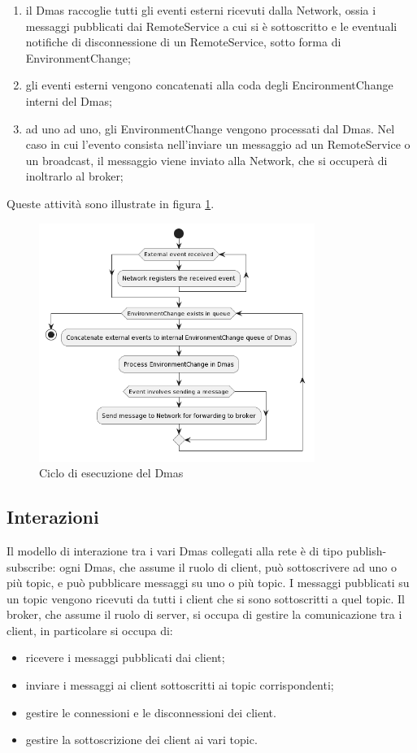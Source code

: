 \begin{enumerate}
    \item il Dmas raccoglie tutti gli eventi esterni ricevuti dalla Network, ossia i messaggi pubblicati dai RemoteService a cui si è sottoscritto e le eventuali notifiche di disconnessione di un RemoteService, sotto forma di EnvironmentChange;
    \item gli eventi esterni vengono concatenati alla coda degli EncironmentChange interni del Dmas;
    \item ad uno ad uno, gli EnvironmentChange vengono processati dal Dmas. Nel caso in cui l'evento consista nell'inviare un messaggio ad un RemoteService o un broadcast, il messaggio viene inviato alla Network, che si occuperà di inoltrarlo al broker;
\end{enumerate}

Queste attività sono illustrate in figura \ref{fig:execution}.

\begin{figure}
    \centering
    \includegraphics[width=0.8\textwidth]{figures/activity-applychanges.png}
    \caption{Ciclo di esecuzione del Dmas}
    \label{fig:execution}
\end{figure}

\subsection{Interazioni}
Il modello di interazione tra i vari Dmas collegati alla rete è di tipo publish-subscribe: ogni Dmas, che assume il ruolo di client, può sottoscrivere ad uno o più topic, e può pubblicare messaggi su uno o più topic.
I messaggi pubblicati su un topic vengono ricevuti da tutti i client che si sono sottoscritti a quel topic.
Il broker, che assume il ruolo di server, si occupa di gestire la comunicazione tra i client, in particolare si occupa di:
\begin{itemize}
    \item ricevere i messaggi pubblicati dai client;
    \item inviare i messaggi ai client sottoscritti ai topic corrispondenti;
    \item gestire le connessioni e le disconnessioni dei client.
    \item gestire la sottoscrizione dei client ai vari topic.
\end{itemize}

